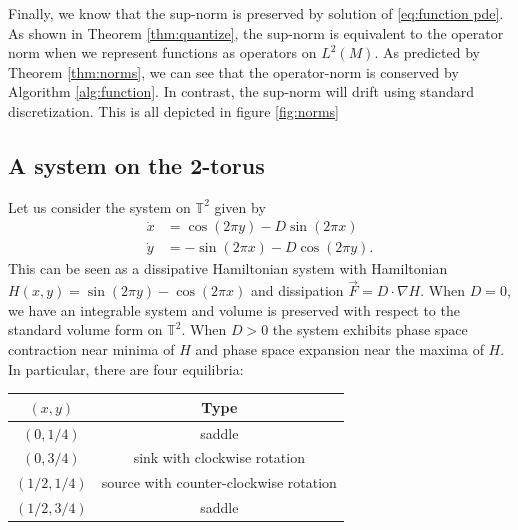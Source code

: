 \documentclass[final,leqno]{siamltex1213}
\begin{document}
Finally, we know that the sup-norm is preserved by solution of \eqref{eq:function pde}.
As shown in Theorem \ref{thm:quantize}, the sup-norm is equivalent to the operator norm when we represent functions as operators on $L^{2}(M)$.
As predicted by Theorem \ref{thm:norms}, we can see that the operator-norm is conserved by Algorithm \ref{alg:function}.
In contrast, the sup-norm will drift using standard discretization.  This is all depicted in figure \ref{fig:norms}


\subsection{A system on the 2-torus}
Let us consider the system on $\mathbb{T}^{2}$ given by 
\begin{align}
	\dot{x} &= \cos(2\pi y) - D \sin(2\pi x) \\
	\dot{y} &= -\sin(2 \pi x) - D \cos(2 \pi y).
\end{align}
This can be seen as a dissipative Hamiltonian system with Hamiltonian $H(x,y) = \sin(2 \pi y) - \cos(2 \pi x)$ and dissipation $\vec{F} = D \cdot \nabla H$.
When $D=0$, we have an integrable system and volume is preserved with respect to the standard volume form on $\mathbb{T}^{2}$.
When $D>0$ the system exhibits phase space contraction near minima of $H$ and phase space expansion near the maxima of $H$.
In particular, there are four equilibria:
\begin{center}
\begin{tabular}{cc}
	$(x,y)$ & Type \\
	\hline
	$(0, 1/4)$ & saddle \\
	$(0, 3/4)$ & sink with clockwise rotation\\
	$(1/2,1/4)$ & source with counter-clockwise rotation \\
	$(1/2,3/4)$ & saddle
\end{tabular}
\end{center}
\end{document}
